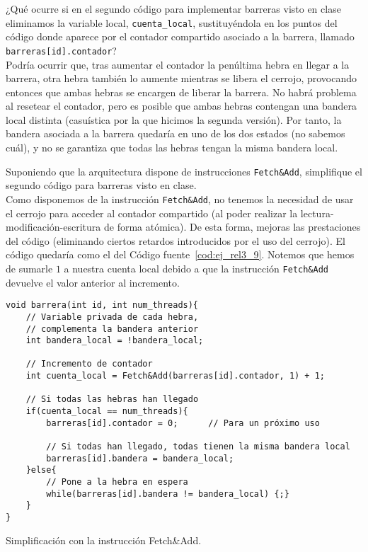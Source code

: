 \begin{ejercicio}
    ¿Qué ocurre si en el segundo código para implementar barreras visto en clase eliminamos la variable local, \verb|cuenta_local|, sustituyéndola en los puntos del código donde aparece por el contador compartido asociado a la barrera, llamado \verb|barreras[id].contador|?\\

    Podría ocurrir que, tras aumentar el contador la penúltima hebra en llegar a la barrera, otra hebra también lo aumente mientras se libera el cerrojo,
    provocando entonces que ambas hebras se encargen de liberar la barrera. No habrá
    problema al resetear el contador, pero es posible que ambas hebras contengan una bandera local distinta (casuística por la que hicimos la segunda versión).
    Por tanto, la bandera asociada a la barrera quedaría en uno de los dos estados (no sabemos cuál), y no se garantiza que todas las hebras tengan la misma bandera local.
\end{ejercicio}

\begin{ejercicio}
    Suponiendo que la arquitectura dispone de instrucciones \verb|Fetch&Add|, simplifique el segundo código para barreras visto en clase.\\

    Como disponemos de la instrucción \verb|Fetch&Add|, no tenemos la necesidad de usar el cerrojo para acceder al contador compartido (al poder realizar la lectura-modificación-escritura de forma atómica). De esta forma, mejoras las prestaciones del código (eliminando ciertos retardos introducidos por el uso del cerrojo). El código quedaría como el del Código fuente~\ref{cod:ej_rel3_9}.
    Notemos que hemos de sumarle $1$ a nuestra cuenta local debido a que la instrucción \verb|Fetch&Add| devuelve el valor anterior al incremento.
\begin{listing}[H]
\begin{verbatim}
void barrera(int id, int num_threads){
    // Variable privada de cada hebra,
    // complementa la bandera anterior
    int bandera_local = !bandera_local;

    // Incremento de contador
    int cuenta_local = Fetch&Add(barreras[id].contador, 1) + 1;

    // Si todas las hebras han llegado
    if(cuenta_local == num_threads){
        barreras[id].contador = 0;      // Para un próximo uso

        // Si todas han llegado, todas tienen la misma bandera local
        barreras[id].bandera = bandera_local;
    }else{
        // Pone a la hebra en espera
        while(barreras[id].bandera != bandera_local) {;}
    }
}
\end{verbatim}
\caption{Simplificación con la instrucción Fetch\&Add.}
\label{cod:ej_rel3_9}
\end{listing}

\end{ejercicio}

